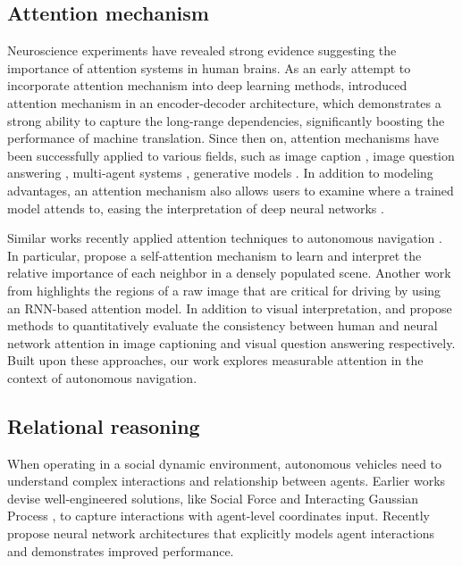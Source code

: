 \documentclass[10pt,twocolumn,letterpaper]{article}
\begin{document}
\subsection{Attention mechanism} 

Neuroscience experiments \cite{posner_attention_1990, petersen_attention_2012} have revealed strong evidence suggesting the importance of attention systems in human brains. As an early attempt to incorporate attention mechanism into deep learning methods, \cite{bahdanau_neural_2014} introduced attention mechanism in an encoder-decoder architecture, which demonstrates a strong ability to capture the long-range dependencies, significantly boosting the performance of machine translation. Since then on, attention mechanisms have been successfully applied to various fields, such as image caption \cite{xu_show_2015}, image question answering \cite{yang_stacked_2016}, multi-agent systems \cite{hoshen_vain:_2017}, generative models \cite{zhang_self-attention_2018}. In addition to modeling advantages, an attention mechanism also allows users to examine where a trained model attends to, easing the interpretation of deep neural networks \cite{kim_interpretable_2017}. 

Similar works recently applied attention techniques to autonomous navigation \cite{vemula_social_2017,chen_brain_2017,kim_interpretable_2017,chen_crowd-robot_2018}. In particular, \cite{kim_interpretable_2017} propose a self-attention mechanism to learn and interpret the relative importance of each neighbor in a densely populated scene. Another work from \cite{chen_crowd-robot_2018} highlights the regions of a raw image that are critical for driving by using an RNN-based attention model. In addition to visual interpretation, \cite{liu_neural_2016} and \cite{das_human_2016} propose methods to quantitatively evaluate the consistency between human and neural network attention in image captioning and visual question answering respectively. Built upon these approaches, our work explores measurable attention in the context of autonomous navigation. 

\subsection{Relational reasoning}

When operating in a social dynamic environment, autonomous vehicles need to understand complex interactions and relationship between agents. Earlier works devise well-engineered solutions, like Social Force \cite{helbing_social_1995} and Interacting Gaussian Process \cite{trautman_unfreezing_2010}, to capture interactions with agent-level coordinates input. Recently \cite{alahi_social_2016} propose neural network architectures that explicitly models agent interactions and demonstrates improved performance. 
\end{document}
